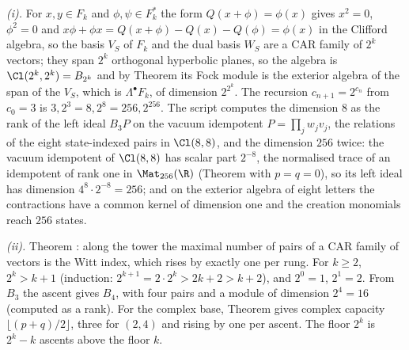 \emph{(i).} For $x, y \in F_{k}$ and $\phi, \psi \in F_{k}^{*}$ the form $Q(x + \phi) = \phi(x)$ gives $x^{2} = 0$, $\phi^{2} = 0$ and $x\phi + \phi x = Q(x + \phi) - Q(x) - Q(\phi) = \phi(x)$ in the Clifford algebra, so the basis $V_{S}$ of $F_{k}$ and the dual basis $W_{S}$ are a CAR family of $2^{k}$ vectors; they span $2^{k}$ orthogonal hyperbolic planes, so the algebra is $\Cl(2^{k}, 2^{k}) = B_{2^{k}}$ and by Theorem  its Fock module is the exterior algebra of the span of the $V_{S}$, which is $\Lambda^{\bullet}F_{k}$, of dimension $2^{2^{k}}$. The recursion $c_{n+1} = 2^{c_{n}}$ from $c_{0} = 3$ is $3, 2^{3} = 8, 2^{8} = 256, 2^{256}$. The script computes the dimension $8$ as the rank of the left ideal $B_{3}P$ on the vacuum idempotent $P = \prod_{j}w_{j}v_{j}$, the relations of the eight state-indexed pairs in $\Cl(8,8)$, and the dimension $256$ twice: the vacuum idempotent of $\Cl(8,8)$ has scalar part $2^{-8}$, the normalised trace of an idempotent of rank one in $\Mat_{256}(\R)$ (Theorem  with $p = q = 0$), so its left ideal has dimension $4^{8} \cdot 2^{-8} = 256$; and on the exterior algebra of eight letters the contractions have a common kernel of dimension one and the creation monomials reach $256$ states.

\emph{(ii).} Theorem : along the tower the maximal number of pairs of a CAR family of vectors is the Witt index, which rises by exactly one per rung. For $k \ge 2$, $2^{k} > k + 1$ (induction: $2^{k+1} = 2 \cdot 2^{k} > 2k + 2 > k + 2$), and $2^{0} = 1$, $2^{1} = 2$. From $B_{3}$ the ascent gives $B_{4}$, with four pairs and a module of dimension $2^{4} = 16$ (computed as a rank). For the complex base, Theorem  gives complex capacity $\lfloor (p+q)/2 \rfloor$, three for $(2,4)$ and rising by one per ascent. The floor $2^{k}$ is $2^{k} - k$ ascents above the floor $k$.

